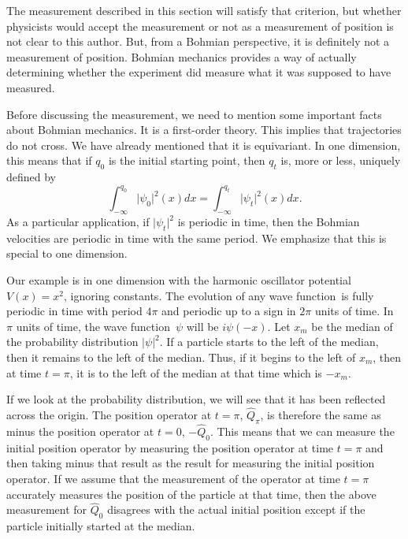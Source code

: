 \documentclass[11pt]{article}
\theoremstyle{remark}
\begin{document}
The measurement described in this section will satisfy that
 criterion, but whether physicists 
 would accept the measurement or not as a measurement of
position is not clear to this author. But, from a Bohmian perspective,
 it is definitely not a measurement of position. Bohmian mechanics
provides a way of actually determining whether the experiment did
measure what it was supposed to have measured. 

Before discussing the measurement, we need to mention some important
facts about Bohmian mechanics. It is a first-order theory. This
implies that trajectories do not cross. We have already mentioned that
it is equivariant. In one dimension, this means that if $q_0$ is the
initial starting point, then $q_t$ is, more or less, uniquely defined by 
\[
\int_{-\infty}^{q_0} \ensuremath{\lvert {\ensuremath{\psi}_0} \rvert}^2 (x) dx = 
\int_{-\infty}^{q_t} \ensuremath{\lvert {\ensuremath{\psi}_t} \rvert}^2 (x) dx  .
\] 
As a particular application,  if
$\ensuremath{\lvert {\ensuremath{\psi}_t} \rvert}^2$ is periodic in time, then the Bohmian velocities are
periodic in time with the same period. We emphasize that this is
special to one dimension.


Our example is in one dimension with the harmonic oscillator potential $V(x) =
x^2$, ignoring constants. The evolution of any wave function\ 
is fully periodic in time with 
period $4 \pi$ and periodic up to a sign in $2\pi$ units of time. 
In $\pi$ units of time, the wave function\ $\psi$ will be $i \psi(-x)$. Let $x_m$ be
the median of the probability distribution $\ensuremath{\lvert {\psi} \rvert}^2$.  If a particle
starts to the left of the median, then it remains to the left of the median. 
Thus, if it begins to the left of $x_m$, 
then at time $t = \pi$, it is to the left of
the median at that time which is $-x_m$. 

If we look at the probability
distribution, we will see that it has been reflected across the
origin. The position operator at $t = \pi$, $\hat{Q}_{\pi}$, is
therefore the same as minus the position operator at $t=0$, 
$- \hat{Q}_{0}$. 
This means that we can measure the initial position operator by
measuring the position operator at time $t=\pi$ and then taking
minus that result as the result for measuring the initial position 
operator. If we assume that the measurement of the operator at time
$t=\pi$ accurately measures the position of the particle at that time,
then the above measurement for $\hat{Q}_0$ disagrees with the actual
initial position except if the particle initially started at the
median. 
\end{document}
